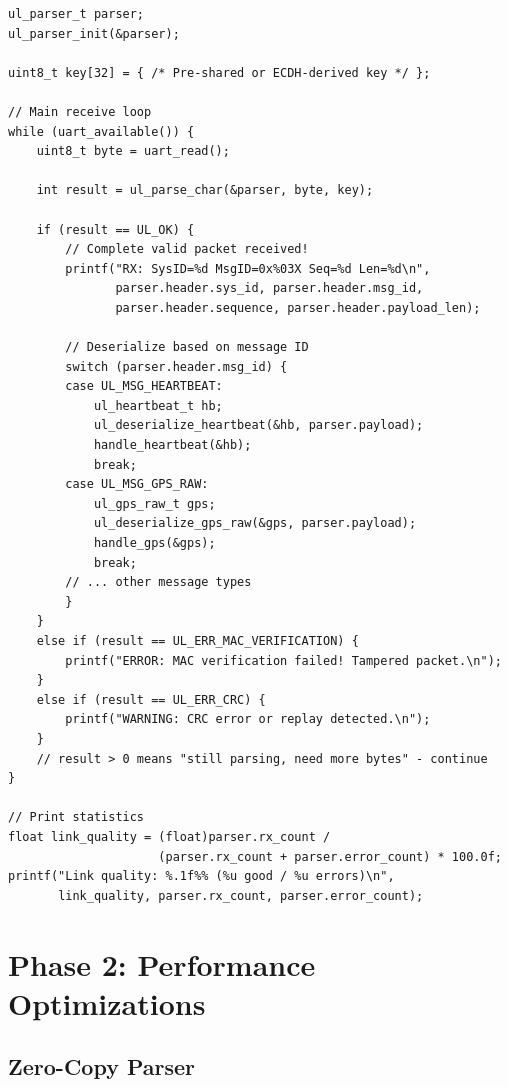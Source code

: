 \documentclass[11pt,a4paper]{article}
\begin{document}
\begin{lstlisting}[caption={Receiving Packets from UART}]
ul_parser_t parser;
ul_parser_init(&parser);

uint8_t key[32] = { /* Pre-shared or ECDH-derived key */ };

// Main receive loop
while (uart_available()) {
    uint8_t byte = uart_read();
    
    int result = ul_parse_char(&parser, byte, key);
    
    if (result == UL_OK) {
        // Complete valid packet received!
        printf("RX: SysID=%d MsgID=0x%03X Seq=%d Len=%d\n",
               parser.header.sys_id, parser.header.msg_id,
               parser.header.sequence, parser.header.payload_len);
        
        // Deserialize based on message ID
        switch (parser.header.msg_id) {
        case UL_MSG_HEARTBEAT:
            ul_heartbeat_t hb;
            ul_deserialize_heartbeat(&hb, parser.payload);
            handle_heartbeat(&hb);
            break;
        case UL_MSG_GPS_RAW:
            ul_gps_raw_t gps;
            ul_deserialize_gps_raw(&gps, parser.payload);
            handle_gps(&gps);
            break;
        // ... other message types
        }
    }
    else if (result == UL_ERR_MAC_VERIFICATION) {
        printf("ERROR: MAC verification failed! Tampered packet.\n");
    }
    else if (result == UL_ERR_CRC) {
        printf("WARNING: CRC error or replay detected.\n");
    }
    // result > 0 means "still parsing, need more bytes" - continue
}

// Print statistics
float link_quality = (float)parser.rx_count / 
                     (parser.rx_count + parser.error_count) * 100.0f;
printf("Link quality: %.1f%% (%u good / %u errors)\n",
       link_quality, parser.rx_count, parser.error_count);
\end{lstlisting}

\newpage
\section{Phase 2: Performance Optimizations}

\subsection{Zero-Copy Parser}
\end{document}

